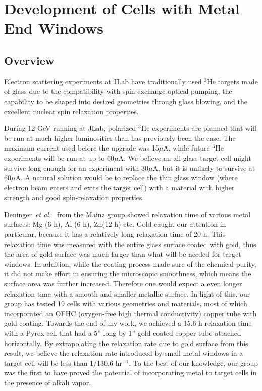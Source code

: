 \chapter{Development of Cells with Metal End Windows}
\label{chap5}

\section{Overview}

Electron scattering experiments at JLab have traditionally used $^{3}$He targets made of glass due to the compatibility with spin-exchange optical pumping, the capability to be shaped into desired geometries through glass blowing, and the excellent nuclear spin relaxation properties. 

During 12 GeV running at JLab, polarized $^3$He experiments are planned that will be run at much higher luminosities than has previously been the case. The maximum current used before the upgrade was 15$\mu$A, while future $^3$He experiments will be run at up to 60$\mu$A. We believe an all-glass target cell might survive long enough for an experiment with 30$\mu$A, but it is unlikely to survive at 60$\mu$A. A natural solution would be to replace the thin glass window (where electron beam enters and exits the target cell) with a material with higher strength and good spin-relaxation properties. 

Deninger~\emph{et al.}~\cite{Schmiedeskamp2006} from the Mainz group showed relaxation time of various metal surfaces: Mg (6 h), Al (6 h), Zn(12 h) etc. Gold caught our attention in particular, because it has a relatively long relaxation time of 20 h. This relaxation time was measured with the entire glass surface coated with gold, thus the area of gold surface was much larger than what will be needed for target windows. In addition, while the coating process made sure of the chemical purity, it did not make effort in ensuring the microscopic smoothness, which means the surface area was further increased. Therefore one would expect a even longer relaxation time with a smooth and smaller metallic surface. In light of this, our group has tested 19 cells with various geometries and materials, most of which incorporated an OFHC (oxygen-free high thermal conductivity) copper tube with gold coating. Towards the end of my work, we achieved a 15.6 h relaxation time with a Pyrex cell that had a 5'' long by 1'' gold coated copper tube attached horizontally. By extrapolating the relaxation rate due to gold surface from this result, we believe the relaxation rate introduced by small metal windows in a target cell will be less than 1/130.6 hr$^{-1}$. To the best of our knowledge, our group was the first to have proved the potential of incorporating metal to target cells in the presence of alkali vapor.

